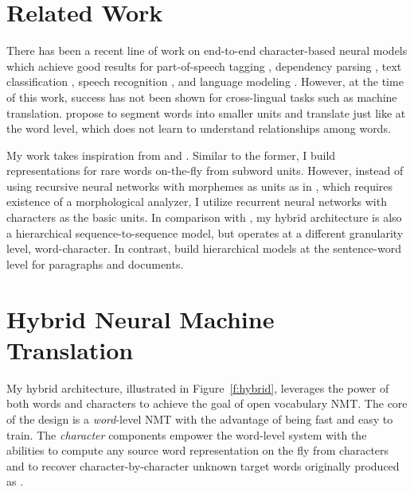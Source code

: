 \section{Related Work}
There has been a recent line of work on end-to-end character-based neural models
which achieve good results for part-of-speech tagging \cite{santos14,ling15function},
dependency parsing \cite{ballesteros15}, text classification
\cite{zhang15}, speech recognition \cite{chan16,bahdanau16}, and language
modeling \cite{kim16,rafal16}. However, at the time of this work, success has not been shown for
cross-lingual tasks such as machine translation.
 propose to segment words into smaller units and
translate just like at the word level, which does not learn to understand
relationships among words.

My work takes inspiration from \cite{luong13} and 
\cite{li15}. Similar to the former, I build representations for rare words
on-the-fly from subword units. However, instead of using recursive neural
networks with morphemes as units as in \cite{luong13}, which requires existence of a
morphological analyzer, I utilize recurrent neural networks
with characters as the basic units. In comparison with \cite{li15}, my hybrid architecture
is also a hierarchical sequence-to-sequence model, but operates at a different
granularity level, word-character. In contrast,  build
hierarchical models at the sentence-word level for paragraphs and documents.

\section{Hybrid Neural Machine Translation}
\label{sec:hybrid}
My hybrid architecture, illustrated in Figure~\ref{f:hybrid}, leverages the power of both words
and characters to achieve the goal of open vocabulary NMT. The core of the
design is a {\it word}-level NMT with the advantage of being fast and easy to
train.
The {\it character} components empower the 
word-level system with the abilities to compute any source word representation on the fly from 
characters and to recover character-by-character unknown target words
originally produced as \unk{}.

